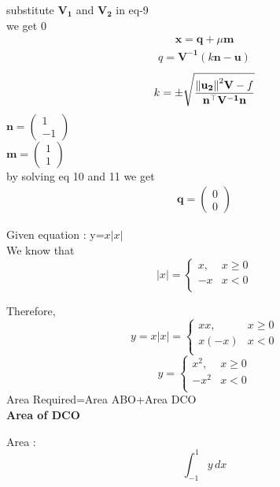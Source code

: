 \documentclass[10pt, a4paper]{article}
\newcommand{\myvec}[1]{\ensuremath{\begin{pmatrix}#1\end{pmatrix}}}
\let\vec\mathbf
\begin{document}
substitute $\vec{V_1}$ and $\vec{V_2}$ in eq-9\\
we get 0\\
\begin{align}
\vec{x}=\vec{q}+\mu{\vec{m}}
\end{align}
\begin{align}
q=\vec{V^{-1}}(k\vec{n}-\vec{u})
\end{align}
\begin{align}
k=\pm\sqrt{\frac{\norm{\vec{u_2}}^2\vec{V}-f}{\vec{n}^{\top}\vec{V^{-1}}\vec{n}}}
\end{align}
$\vec{n}=\myvec{1\\-1}$\\
$\vec{m}=\myvec{1\\1}$\\

by solving eq 10 and 11 we get\\
\begin{align}
\vec{q}=\myvec{0\\0}
\end{align}


 Given equation :  y=$x|x|$\\

We know that \\
\begin{equation}
   |x| =
    \begin{cases}
      x, & {x\geq0}\\
      -x & {x<0}\\
    \end{cases}       
\end{equation}

	Therefore,
\begin{equation}
   y=x|x| =
    \begin{cases}
      xx, & {x\geq0}\\
      x(-x) & {x<0}\\
    \end{cases}       
\end{equation}
\begin{equation}
   y =
    \begin{cases}
      x^2, & {x\geq0}\\
      -x^2 & {x<0}\\
    \end{cases}       
\end{equation}
Area Required=Area ABO+Area DCO\\
\textbf{Area of DCO}

Area  : \[ \int_{-1}^{1} y \,dx \]
\end{document}
